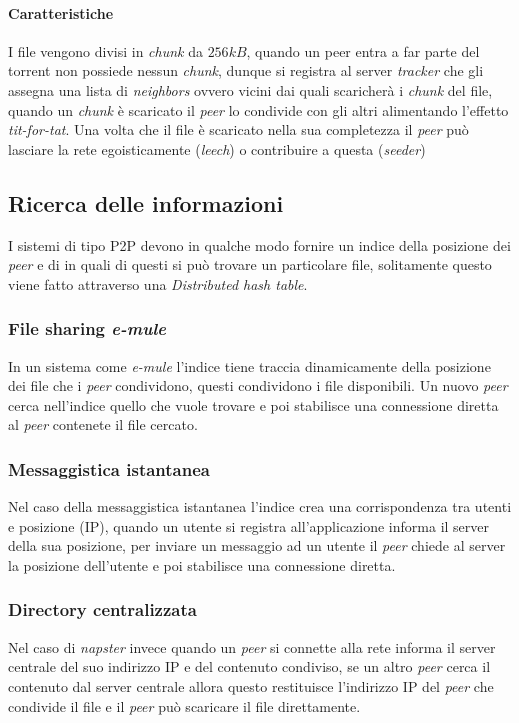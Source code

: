             \paragraph{Caratteristiche} I file vengono divisi in \textit{chunk} da $ 256kB $, quando un peer entra a far parte del torrent non possiede nessun \textit{chunk}, dunque si registra al server \textit{tracker} che gli assegna una lista di \textit{neighbors} ovvero vicini dai quali scaricherà i \textit{chunk} del file, quando un \textit{chunk} è scaricato il \textit{peer} lo condivide con gli altri alimentando l'effetto \textit{tit-for-tat}. Una volta che il file è scaricato nella sua completezza il \textit{peer} può lasciare la rete egoisticamente (\textit{leech}) o contribuire a questa (\textit{seeder})
    \subsection{Ricerca delle informazioni}
        I sistemi di tipo \Acrshort*{P2P} devono in qualche modo fornire un indice della posizione dei \textit{peer} e di in quali di questi si può trovare un particolare file, solitamente questo viene fatto attraverso una \textit{Distributed hash table}.
            \subsubsection{File sharing \textit{e-mule}}
                In un sistema come \textit{e-mule} l'indice tiene traccia dinamicamente della posizione dei file che i \textit{peer} condividono, questi condividono i file disponibili. Un nuovo \textit{peer} cerca nell'indice quello che vuole trovare e poi stabilisce una connessione diretta al \textit{peer} contenete il file cercato.
            \subsubsection{Messaggistica istantanea}
                Nel caso della messaggistica istantanea l'indice crea una corrispondenza tra utenti e posizione (\Acrshort*{IP}), quando un utente si registra all'applicazione informa il server della sua posizione, per inviare un messaggio ad un utente il \textit{peer} chiede al server la posizione dell'utente e poi stabilisce una connessione diretta.
            \subsubsection{Directory centralizzata}
                Nel caso di \textit{napster} invece quando un \textit{peer} si connette alla rete informa il server centrale del suo indirizzo \Acrshort*{IP} e del contenuto condiviso, se un altro \textit{peer} cerca il contenuto dal server centrale allora questo restituisce l'indirizzo \Acrshort*{IP} del \textit{peer} che condivide il file e il \textit{peer} può scaricare il file direttamente.
